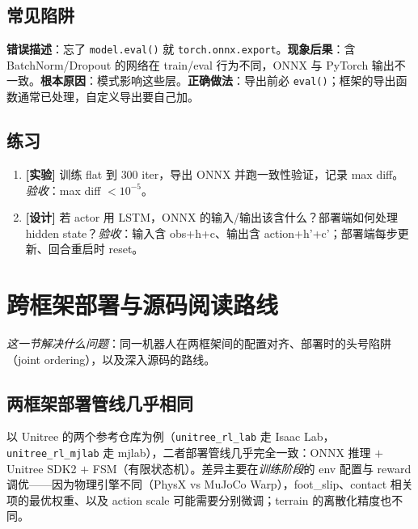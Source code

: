 \subsection{常见陷阱}

\begin{pitfall}
\textbf{错误描述}：忘了 \verb|model.eval()| 就 \verb|torch.onnx.export|。\textbf{现象后果}：含 BatchNorm/Dropout 的网络在 train/eval 行为不同，ONNX 与 PyTorch 输出不一致。\textbf{根本原因}：模式影响这些层。\textbf{正确做法}：导出前必 \verb|eval()|；框架的导出函数通常已处理，自定义导出要自己加。
\end{pitfall}

\subsection{练习}

\begin{practice}[导出与边界]
\begin{enumerate}
  \item \textbf{[实验]} 训练 flat 到 $300$ iter，导出 ONNX 并跑一致性验证，记录 max diff。\emph{验收}：max diff $<10^{-5}$。
  \item \textbf{[设计]} 若 actor 用 LSTM，ONNX 的输入/输出该含什么？部署端如何处理 hidden state？\emph{验收}：输入含 obs+h+c、输出含 action+h'+c'；部署端每步更新、回合重启时 reset。
\end{enumerate}
\end{practice}

\section{跨框架部署与源码阅读路线}
\label{sec:rlmc-train-deploy}

\emph{这一节解决什么问题}：同一机器人在两框架间的配置对齐、部署时的头号陷阱（joint ordering），以及深入源码的路线。

\subsection{两框架部署管线几乎相同}

以 Unitree 的两个参考仓库为例（\verb|unitree_rl_lab| 走 Isaac Lab，\verb|unitree_rl_mjlab| 走 mjlab），二者部署管线几乎完全一致：ONNX 推理 $+$ Unitree SDK2 $+$ FSM（有限状态机）。差异主要在\emph{训练阶段}的 env 配置与 reward 调优——因为物理引擎不同（PhysX vs MuJoCo Warp），foot\_slip、contact 相关项的最优权重、以及 action scale 可能需要分别微调；terrain 的离散化精度也不同。

